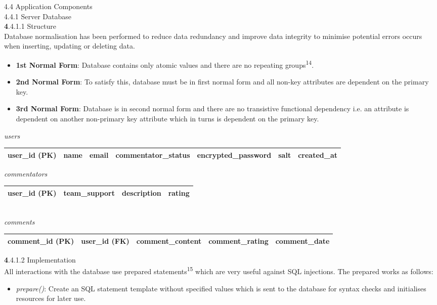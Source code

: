 \documentclass{article}
\begin{document}
\begin{flushleft}
{\Large 4.4 Application Components}\\
{\large 4.4.1 Server Database}\\
{\textbf 4.4.1.1 Structure}\\
Database normalisation has been performed to reduce data redundancy and improve data integrity to minimise potential errors occurs when inserting, updating or deleting data.\\
\begin{itemize}
	\item \textbf{1st Normal Form}: Database contains only atomic values and there are no repeating groups\textsuperscript{14}.
	\item \textbf{2nd Normal Form}: To satisfy this, database must be in first normal form and all non-key attributes are dependent on the primary key.
	\item \textbf{3rd Normal Form}: Database is in second normal form and there are no transistive functional dependency i.e. an attribute is dependent on another non-primary key attribute which in turns is dependent on the primary key.
\end{itemize}
\textit{users}
\begin{tabular}{| c | c | c | c | c | c | c |}
\hline
user\_id (PK) & name & email & commentator\_status & encrypted\_password & salt & created\_at\\
\hline
\end{tabular}
\textit{commentators}\\
\begin{tabular}{| c | c | c | c |}
\hline
user\_id (PK) & team\_support & description & rating\\
\hline
\end{tabular}\\
\textit{comments}
\begin{tabular}{| c | c | c | c | c |}
\hline
comment\_id (PK) & user\_id (FK) & comment\_content & comment\_rating & comment\_date\\
\hline
\end{tabular}
{\textbf 4.4.1.2 Implementation}\\
All interactions with the database use prepared statements\textsuperscript{15} which are very useful against SQL injections. The prepared works as follows:
\begin{itemize}
	\item \textit{prepare()}: Create an SQL statement template without specified values which is sent to the database for syntax checks and initialises resources for later use.

\end{itemize}
\end{flushleft}
\end{document}
